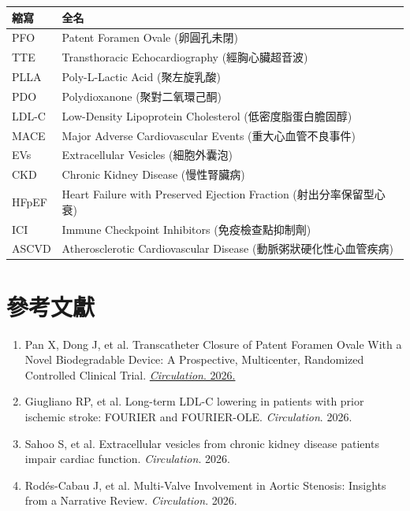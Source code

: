 \documentclass[12pt,a4paper]{article}
\begin{document}
\begin{longtable}{p{4cm}p{10cm}}
\toprule
\textbf{縮寫} & \textbf{全名} \\
\midrule
\endfirsthead
\bottomrule
\endfoot

PFO & Patent Foramen Ovale (卵圓孔未閉) \\
TTE & Transthoracic Echocardiography (經胸心臟超音波) \\
PLLA & Poly-L-Lactic Acid (聚左旋乳酸) \\
PDO & Polydioxanone (聚對二氧環己酮) \\
LDL-C & Low-Density Lipoprotein Cholesterol (低密度脂蛋白膽固醇) \\
MACE & Major Adverse Cardiovascular Events (重大心血管不良事件) \\
EVs & Extracellular Vesicles (細胞外囊泡) \\
CKD & Chronic Kidney Disease (慢性腎臟病) \\
HFpEF & Heart Failure with Preserved Ejection Fraction (射出分率保留型心衰) \\
ICI & Immune Checkpoint Inhibitors (免疫檢查點抑制劑) \\
ASCVD & Atherosclerotic Cardiovascular Disease (動脈粥狀硬化性心血管疾病) \\
\bottomrule
\end{longtable}

\section{參考文獻}

\begin{enumerate}
    \item Pan X, Dong J, et al. Transcatheter Closure of Patent Foramen Ovale With a Novel Biodegradable Device: A Prospective, Multicenter, Randomized Controlled Clinical Trial. \href{https://www.ahajournals.org/doi/10.1161/CIRCULATIONAHA.125.074609}{\textit{Circulation}. 2026.}

    \item Giugliano RP, et al. Long-term LDL-C lowering in patients with prior ischemic stroke: FOURIER and FOURIER-OLE. \textit{Circulation}. 2026.

    \item Sahoo S, et al. Extracellular vesicles from chronic kidney disease patients impair cardiac function. \textit{Circulation}. 2026.

    \item Rodés-Cabau J, et al. Multi-Valve Involvement in Aortic Stenosis: Insights from a Narrative Review. \textit{Circulation}. 2026.
\end{enumerate}
\end{document}
